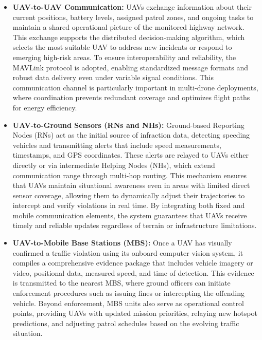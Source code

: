 \begin{itemize}
    \item \textbf{UAV-to-UAV Communication:}  
    UAVs exchange information about their current positions, battery levels, assigned patrol zones, and ongoing tasks to maintain a shared operational picture of the monitored highway network. This exchange supports the distributed decision-making algorithm, which selects the most suitable UAV to address new incidents or respond to emerging high-risk areas. To ensure interoperability and reliability, the MAVLink protocol is adopted, enabling standardized message formats and robust data delivery even under variable signal conditions. This communication channel is particularly important in multi-drone deployments, where coordination prevents redundant coverage and optimizes flight paths for energy efficiency.

    \item \textbf{UAV-to-Ground Sensors (RNs and NHs):}  
    Ground-based Reporting Nodes (RNs) act as the initial source of infraction data, detecting speeding vehicles and transmitting alerts that include speed measurements, timestamps, and GPS coordinates. These alerts are relayed to UAVs either directly or via intermediate Helping Nodes (NHs), which extend communication range through multi-hop routing. This mechanism ensures that UAVs maintain situational awareness even in areas with limited direct sensor coverage, allowing them to dynamically adjust their trajectories to intercept and verify violations in real time. By integrating both fixed and mobile communication elements, the system guarantees that UAVs receive timely and reliable updates regardless of terrain or infrastructure limitations.

    \item \textbf{UAV-to-Mobile Base Stations (MBS):}  
    Once a UAV has visually confirmed a traffic violation using its onboard computer vision system, it compiles a comprehensive evidence package that includes vehicle imagery or video, positional data, measured speed, and time of detection. This evidence is transmitted to the nearest MBS, where ground officers can initiate enforcement procedures such as issuing fines or intercepting the offending vehicle. Beyond enforcement, MBS units also serve as operational control points, providing UAVs with updated mission priorities, relaying new hotspot predictions, and adjusting patrol schedules based on the evolving traffic situation.


\end{itemize}
